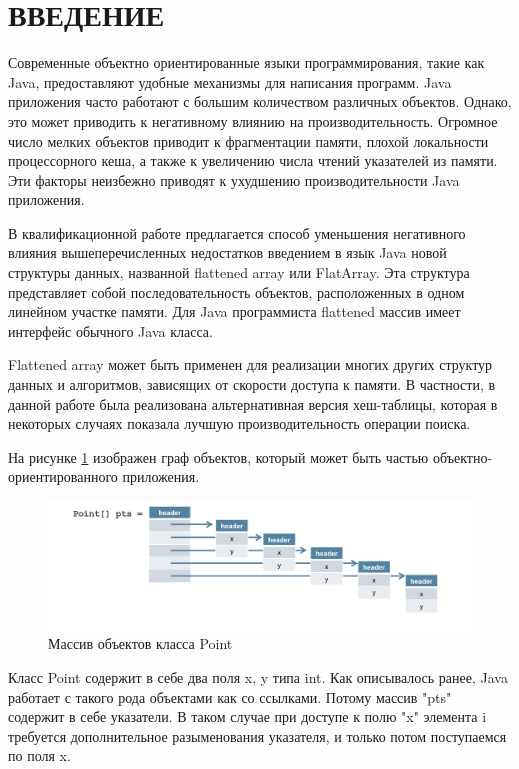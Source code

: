\section*{ВВЕДЕНИЕ}
\addtocounter{section}{1}
\setcounter{subsection}{0}

Современные объектно ориентированные языки программирования, такие как Java, предоставляют удобные механизмы для написания программ. Java приложения часто работают с большим количеством различных объектов. 
Однако, это может приводить к негативному влиянию на производительность. Огромное число мелких объектов приводит к фрагментации памяти, плохой локальности процессорного кеша, а также к увеличению числа чтений указателей из памяти. Эти факторы неизбежно приводят к ухудшению производительности Java приложения.
\par
В квалификационной работе предлагается способ уменьшения негативного влияния вышеперечисленных недостатков введением в язык Java новой структуры данных, названной flattened array или FlatArray. Эта структура представляет собой последовательность объектов, расположенных в одном линейном участке памяти. 
Для Java программиста flattened массив имеет интерфейс обычного Java класса.
\par
Flattened array может быть применен для реализации многих других структур данных и алгоритмов, зависящих от скорости доступа к памяти. В частности, в данной работе была реализована альтернативная версия хеш-таблицы, которая в некоторых случаях показала лучшую производительность операции поиска.
\par
На рисунке \ref{ref-graph} изображен граф объектов, который может быть частью объектно-ориентированного приложения.
\begin{figure}[h]
	\includegraphics[width=0.95\linewidth]{image/reference.png}
	\caption{Массив объектов класса Point}\label{ref-graph}
\end{figure}
Класс Point содержит в себе два поля x, y типа int. Как описывалось ранее, Java работает с 
такого рода объектами как со ссылками. Потому массив "pts" содержит в себе указатели. В таком случае при доступе к полю "x" элемента i требуется дополнительное разыменования указателя, и только потом поступаемся по поля x.
